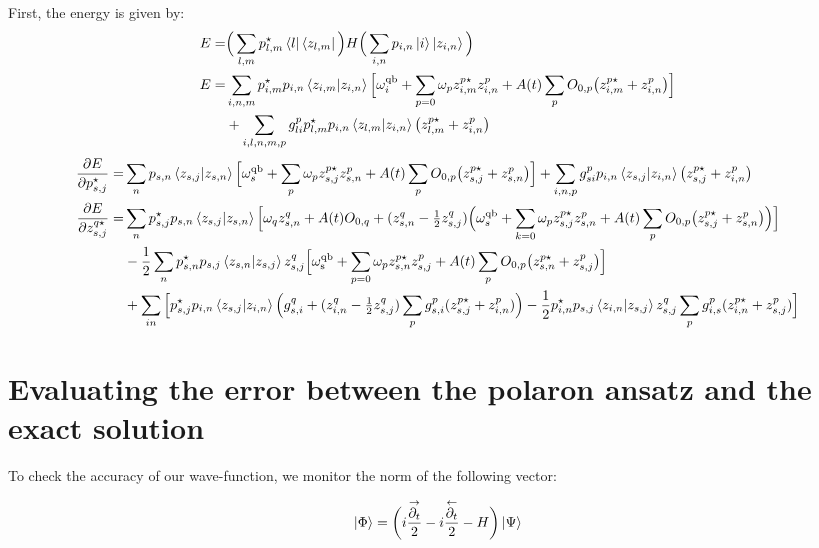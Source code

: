 \documentclass[prb]{revtex4}
\newcommand{\eq}[1]{\begin{align}#1\end{align}}
\begin{document}
First, the energy is given by:
\eq{	
E =& \Big(  \sum_{l,m} p_{l,m}^\star \bra{l} \bra{z_{l,m}}\Big) H \Big(  \sum_{i,n} p_{i,n}\ket{i} \ket{z_{i,n}}\Big)  \notag \\
E=& \sum_{i,n,m}  p_{i,m}^{\star} p_{i,n}  \braket{ z_{i,m} | z_{i,n} } \Bigl[\omega^{\rm qb}_i  +\sum_{p=0} \omega_p z_{i,m}^{p\star} z_{i,n}^p + A(t)\sum_{p} O_{0,p}\big(z_{i,m}^{p\star} + z_{i,n}^{p}\big)   \Bigr]  \notag \\
&+  \sum_{i,l,n,m,p}  g^{p}_{li}  p_{l,m}^{\star} p_{i,n}  \braket{ z_{l,m} | z_{i,n} } \big(z_{l,m}^{p\star} + z_{i,n}^{p}\big)
}
%
\eq{	
\frac{\partial E}{\partial p_{s,j}^\star} =& \sum_{n}   p_{s,n} \braket{ z_{s,j} | z_{s,n} } \Bigl[\omega^{\rm qb}_s  +  \sum_p \omega_p z_{s,j}^{p\star} z_{s,n}^p  + A(t)\sum_{p} O_{0,p}\big(z_{s,j}^{p\star} + z_{s,n}^{p}\big) \Bigr]  +  \sum_{i,n,p}  g^{p}_{si}  p_{i,n}  \braket{ z_{s,j} | z_{i,n} } \big(z_{s,j}^{p\star} + z_{i,n}^{p}\bigr)
\\
%
\frac{\partial E}{\partial z_{s,j}^{q\star}} =&\sum_{n}   p_{s,j}^\star p_{s,n} \braket{ z_{s,j} | z_{s,n} }  \Bigl[ \omega_q z_{s,n}^{q} 
+ A(t) O_{0,q} +( z_{s,n}^{q} - \tfrac{1}{2}z_{s,j}^{q} ) \Big(\omega_s^{\rm qb} + \sum_{k=0} \omega_p z_{s,j}^{p\star} z_{s,n}^p + A(t)\sum_{p} O_{0,p}\big(z_{s,j}^{p\star} + z_{s,n}^{p}\big) \Big) \Big] \notag \\
& - \frac{1}{2} \sum_n p_{s,n}^\star p_{s,j}  \braket{z_{s,n}|z_{s,j}} z_{s,j}^{q} \Big[  \omega_{\rm s}^{\rm qb} + \sum_{p=0}  \omega_p z_{s,n}^{p\star} z_{s,j}^p + A(t)\sum_{p} O_{0,p}\big(z_{s,n}^{p\star} + z_{s,j}^{p}\big)  \Big] \notag\\
&+\sum_{in} \Big[  p_{s,j}^\star p_{i,n} \braket{z_{s,j} |z_{i,n} } \Big(g_{s,i}^{q} + (z_{i,n}^{q} - \tfrac{1}{2}z_{s,j}^{q})\sum_p g_{s,i}^{p}  ( z_{s,j}^{p\star} +z_{i,n}^{p} )  \Big) - \frac{1}{2}p_{i,n}^\star p_{s,j}  \braket{z_{i,n}|z_{s,j}} z_{s,j}^{q} \sum_p g_{i,s}^{p} (z_{i,n}^{p\star} + z_{s,j}^{p}) \Big] 
}

\section{Evaluating the error between the polaron ansatz and the exact solution}

To check the accuracy of our wave-function, we monitor the norm of the following vector:

\begin{equation}
\ket{\Phi} =  \biggl( i \frac{\overset{\rightarrow}{\partial_t}}{2} - i \frac{\overset{\leftarrow}{\partial_t}}{2} - H \biggr) \ket{ \Psi}
\end{equation}
\end{document}
